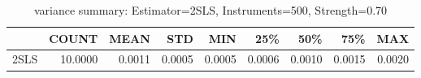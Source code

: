 \begin{table}[ht]
\centering
\caption{variance summary: Estimator=2SLS, Instruments=500, Strength=0.70}
\begin{tabular}{lrrrrrrrr}
\toprule
 & COUNT & MEAN & STD & MIN & 25\% & 50\% & 75\% & MAX \\
\midrule
2SLS & 10.0000 & 0.0011 & 0.0005 & 0.0005 & 0.0006 & 0.0010 & 0.0015 & 0.0020 \\
\bottomrule
\end{tabular}
\end{table}
